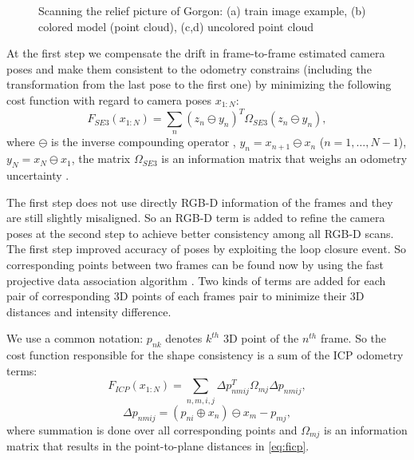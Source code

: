 \documentclass[letterpaper, 10 pt, conference]{ieeeconf}  %
\begin{document}
\begin{figure}[t]
\begin{subfigure}[b]{0.45\linewidth}
                \caption{}
        \end{subfigure}
        \caption{Scanning the relief picture of Gorgon: (a) train image example,
        (b) colored model (point cloud), (c,d) uncolored point cloud}
        \label{fig:gorgon}
\end{figure}

At the first step we compensate the drift in frame-to-frame estimated camera poses and 
make them consistent to the odometry constrains (including the transformation from the last pose
to the first one) by minimizing the following cost function
with regard to camera poses $x_{1:N}$:
\begin{equation} \label{eq:ffirst}
F_{SE3}(x_{1:N}) = \sum_n (z_n \ominus y_n)^T \Omega_{SE3} (z_n \ominus y_n),
\end{equation}
where $\ominus$ is the inverse compounding operator \cite{lu1997globally},
$y_n=x_{n+1} \ominus x_{n}$ ($n=1,\dots, N-1$), $y_N=x_N \ominus x_1$,
the matrix $\Omega_{SE3}$ is an information matrix that weighs an odometry uncertainty \cite{kuemmerle2011g2o}.

The first step does not use directly RGB-D information of the frames and they are
still slightly misaligned. So an RGB-D term is added to refine the camera poses at the second step 
to achieve better consistency among all RGB-D scans.
The first step improved accuracy of poses by exploiting the loop closure event.
So corresponding points between two frames can be found now by using
the fast projective data association algorithm \cite{rusinkiewicz2001efficient}.
Two kinds of terms are added for each pair of corresponding 3D points of each frames pair
to minimize their 3D distances and intensity difference.

We use a common notation: $p_{nk}$ denotes $k^{th}$ 3D point of 
the $n^{th}$ frame. So the cost function responsible for the shape consistency is
a sum of the ICP odometry terms:
\begin{equation} \label{eq:ficp}
    F_{ICP}(x_{1:N}) = \sum_{n,m,i,j} \Delta p_{nmij}^T \Omega_{mj} \Delta p_{nmij},
\end{equation}
\begin{equation}
    \Delta p_{nmij}=(p_{ni} \oplus x_n) \ominus x_m - p_{mj},
\end{equation}
where summation is done over all corresponding points and $\Omega_{mj}$ is 
an information matrix that results in the point-to-plane 
distances in \eqref{eq:ficp}.
\end{document}
